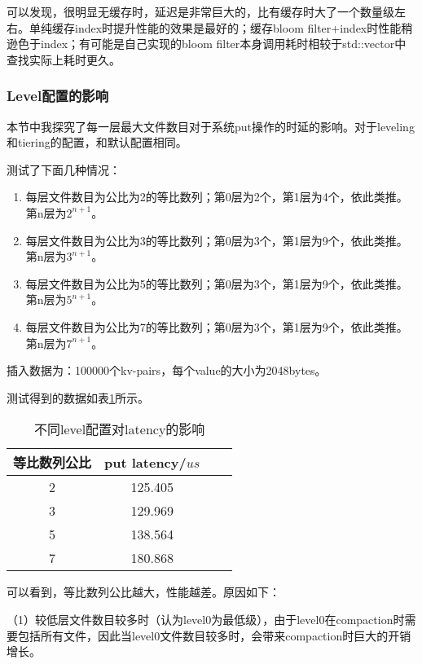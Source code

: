 \documentclass[fontset=windows]{article}
\begin{document}
可以发现，很明显无缓存时，延迟是非常巨大的，比有缓存时大了一个数量级左右。单纯缓存index时提升性能的效果是最好的；缓存bloom filter+index时性能稍逊色于index；有可能是自己实现的bloom filter本身调用耗时相较于std::vector中查找实际上耗时更久。

\subsubsection{Level配置的影响}
本节中我探究了每一层最大文件数目对于系统put操作的时延的影响。对于leveling和tiering的配置，和默认配置相同。

测试了下面几种情况：
\begin{enumerate}
    \item 每层文件数目为公比为2的等比数列；第0层为2个，第1层为4个，依此类推。第n层为$2^{n+1}$。
    
    \item 每层文件数目为公比为3的等比数列；第0层为3个，第1层为9个，依此类推。第n层为$3^{n+1}$。
    
    \item 每层文件数目为公比为5的等比数列；第0层为3个，第1层为9个，依此类推。第n层为$5^{n+1}$。
    
    \item 每层文件数目为公比为7的等比数列；第0层为3个，第1层为9个，依此类推。第n层为$7^{n+1}$。
\end{enumerate}

插入数据为：100000个kv-pairs，每个value的大小为2048bytes。

测试得到的数据如表\ref{table4}所示。

\begin{table}[h!]
    \begin{center}
      \caption{不同level配置对latency的影响}
      \label{table4}
      \begin{tabular}{c|c|c|c}
        \textbf{等比数列公比} & \textbf{put latency/$us$} \\
        \hline
        2 & 125.405 \\ 
        3 & 129.969 \\
        5 & 138.564 \\
        7 & 180.868 \\
      \end{tabular}
    \end{center}
\end{table}

可以看到，等比数列公比越大，性能越差。原因如下：

（1）较低层文件数目较多时（认为level0为最低级），由于level0在compaction时需要包括所有文件，因此当level0文件数目较多时，会带来compaction时巨大的开销增长。
\end{document}
